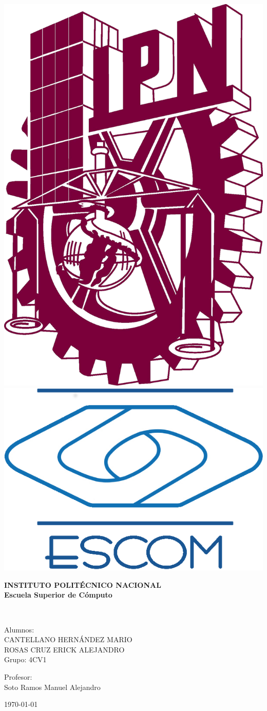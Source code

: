 \thispagestyle{empty}
\begin{center}  
  \includegraphics[height=1.20 in]{./image/title-page/IPN.png}
  \hspace{3.85 in}
	\includegraphics[height=1.20 in]{./image/title-page/ESCOM.png}
	\vspace{0.05 in}
	
	\begin{LARGE} \bf
		INSTITUTO POLIT\'ECNICO NACIONAL\\[6 pt]
		Escuela Superior de Cómputo\\[30 pt]
	\end{LARGE}
	
	\vspace{0.8 in}
	\begin{Large}
		\textbf{\nameDoc}\\[15 pt]
	\vspace{1 in}
		
		Alumnos:\\ 
		CANTELLANO HERN\'ANDEZ MARIO\\[6 pt]
		ROSAS CRUZ ERICK ALEJANDRO\\[30 pt]

		Grupo: 4CV1 \\[20pt]
	\end{Large}
	
	\begin{large}
	Profesor:\\[12 pt]
	Soto Ramos Manuel Alejandro\\[6 pt]
	\vfill
	\end{large}

	 \ddmmyydate\today
\end{center}
